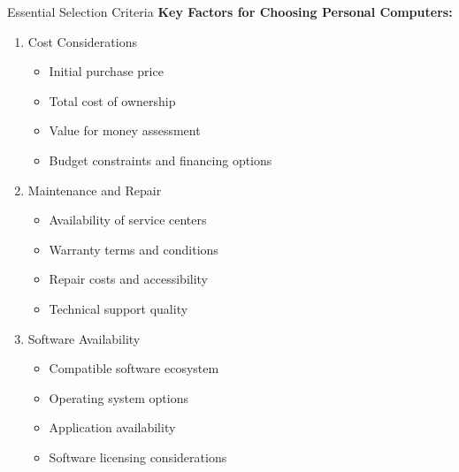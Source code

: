 \documentclass[aspectratio=169]{beamer}
\begin{document}
\begin{frame}{Essential Selection Criteria}
    \textbf{Key Factors for Choosing Personal Computers:}
    
    \begin{enumerate}
        \item Cost Considerations
        \begin{itemize}
            \item Initial purchase price
            \item Total cost of ownership
            \item Value for money assessment
            \item Budget constraints and financing options
        \end{itemize}
        
        \item Maintenance and Repair
        \begin{itemize}
            \item Availability of service centers
            \item Warranty terms and conditions
            \item Repair costs and accessibility
            \item Technical support quality
        \end{itemize}
        
        \item Software Availability
        \begin{itemize}
            \item Compatible software ecosystem
            \item Operating system options
            \item Application availability
            \item Software licensing considerations
        \end{itemize}
    \end{enumerate}
\end{frame}
\end{document}
